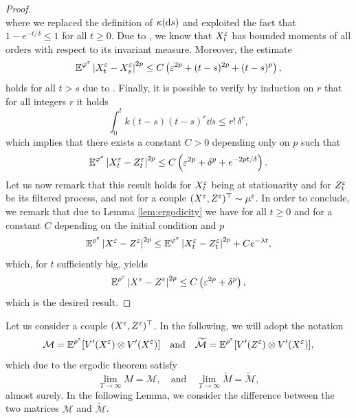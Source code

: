 \documentclass[10pt]{article}
\begin{document}
\begin{appendices}
\begin{proof}
\begin{equation}
	\end{equation}
	where we replaced the definition of $\kappa(\mathrm{d} s)$ and exploited the fact that $1 - e^{-t/\delta}\leq 1$ for all $t \geq 0$. Due to \cite[Corollary 5.4]{PaS07}, we know that $X^\varepsilon_t$ has bounded moments of all orders with respect to its invariant measure. Moreover, the estimate
	\begin{equation}
	\operatorname{\mathbb{E}}^{\varphi^\varepsilon}\left\lvert X_t^\varepsilon - X_s^\varepsilon\right\rvert^{2p} \leq C\left(\varepsilon^{2p} + (t-s)^{2p} + (t-s)^p\right),
	\end{equation}
	holds for all $t > s$ due to \cite[Lemma 6.1]{PaS07}. Finally, it is possible to verify by induction on $r$ that for all integers $r$ it holds
	\begin{equation}
	\int_0^t k(t-s) (t - s)^r \dd s \leq r! \, \delta^r, 
	\end{equation}
	which implies that there exists a constant $C > 0$ depending only on $p$ such that
	\begin{equation}
	\operatorname{\mathbb{E}}^{\varphi^\varepsilon}\left\lvert X_t^\varepsilon - Z_t^\varepsilon\right\rvert^{2p} \leq C\left(\varepsilon^{2p} + \delta^p + e^{-2pt/\delta}\right).
	\end{equation}
	Let us now remark that this result holds for $X_t^\varepsilon$ being at stationarity and for $Z_t^\varepsilon$ be its filtered process, and not for a couple $(X^\varepsilon, Z^\varepsilon)^\top \sim \mu^\varepsilon$. In order to conclude, we remark that due to Lemma \ref{lem:ergodicity} we have for all $t \geq 0$ and for a constant $C$ depending on the initial condition and $p$  
	\begin{equation}
	\operatorname{\mathbb{E}}^{\rho^\varepsilon} \left\lvert X^\varepsilon - Z^\varepsilon\right\rvert^{2p} \leq \operatorname{\mathbb{E}}^{\varphi^\varepsilon}\left\lvert X_t^\varepsilon - Z_t^\varepsilon\right\rvert^{2p} + Ce^{-\lambda t},
	\end{equation}
	which, for $t$ sufficiently big, yields
	\begin{equation}
	\operatorname{\mathbb{E}}^{\rho^\varepsilon} \left\lvert X^\varepsilon - Z^\varepsilon\right\rvert^{2p} \leq C\left(\varepsilon^{2p} + \delta^p\right),
	\end{equation}
	which is the desired result.
\end{proof}

Let us consider a couple $(X^\varepsilon, Z^\varepsilon)^\top$. In the following, we will adopt the notation
\begin{equation}\label{eq:CalM}
\mathcal M = \operatorname{\mathbb{E}}^{\rho^\varepsilon}[V'(X^\varepsilon) \otimes V'(X^\varepsilon)] \quad \text{and} \quad \widetilde{\mathcal M} = \operatorname{\mathbb{E}}^{\rho^\varepsilon}[V'(Z^\varepsilon) \otimes V'(X^\varepsilon)],
\end{equation}
which due to the ergodic theorem satisfy
\begin{equation}
\lim_{T \to \infty} M = \mathcal M, \quad \text{and} \quad \lim_{T \to \infty} \widetilde M = \mathcal{\widetilde M},
\end{equation}
almost surely. In the following Lemma, we consider the difference between the two matrices $\mathcal M$ and $\widetilde{\mathcal M}$.


\end{appendices}
\end{document}
